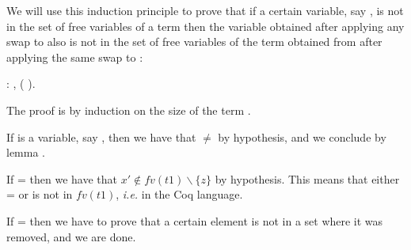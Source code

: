 We will use this induction principle to prove that if a certain variable, say , is not in the set of free variables of a term  then the variable obtained after applying any swap to  also is not in the set of free variables of the term obtained from  after applying the same swap to : 
\begin{coqdoccode}
\coqdocnoindent
{}  : \coqdockw{\ensuremath{\forall}}    ,             (   ).\coqdoceol
\end{coqdoccode}
 The proof is by induction on the size of the term .
\begin{coqdoccode}
\end{coqdoccode}
If  is a variable, say , then we have that  \ensuremath{\not=}  by hypothesis, and we conclude by lemma .
\begin{coqdoccode}
\end{coqdoccode}
If  =    then we have that $x' \notin fv(t1) \backslash \{z\}$ by hypothesis. This means that either  =  or  is not in $fv(t1)$, {\it i.e.}   in the Coq language.
\begin{coqdoccode}
\end{coqdoccode}
If  =  then we have to prove that a certain element is not in a set where it was removed, and we are done. 
